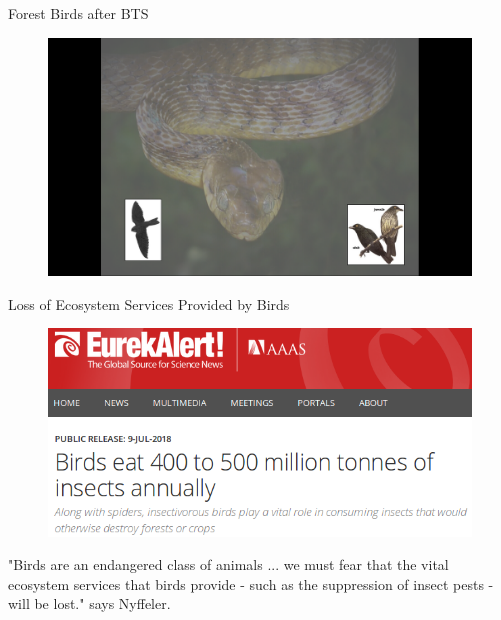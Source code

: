 \documentclass[]{beamer}
\begin{document}
\begin{frame}{Forest Birds after BTS}
	\begin{figure}
		\includegraphics[height=0.8\textheight]{birds-after-bts.png}
	\end{figure}
\end{frame}

\begin{frame}{Loss of Ecosystem Services Provided by Birds}
	\begin{figure}
		\includegraphics[height=0.5\textheight]{eureka-bird-loss.png}
	\end{figure}
	"Birds are an endangered class of animals ... we must fear that the vital ecosystem services that birds provide - such as the suppression of insect pests - will be lost." says Nyffeler.
\end{frame}


 
\end{document}
